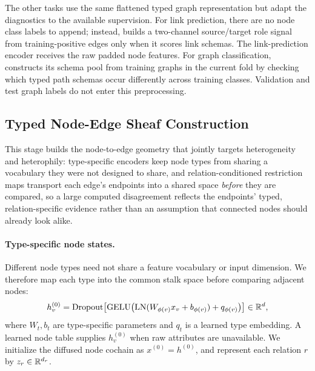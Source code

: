 The other tasks use the same flattened typed graph representation but adapt the diagnostics to the
available supervision.  For link prediction, there are no node class labels to append; instead,
\ampss{} builds a two-channel source/target role signal from training-positive edges only when it
scores link schemas.  The link-prediction encoder receives the raw padded node features.  For graph
classification, \ampss{} constructs its schema pool from training graphs in the current fold by
checking which typed path schemas occur differently across training classes.  Validation and test
graph labels do not enter this preprocessing.

\subsection{Typed Node-Edge Sheaf Construction}

This stage builds the node-to-edge geometry that jointly targets heterogeneity and heterophily:
type-specific encoders keep node types from sharing a vocabulary they were not designed to share,
and relation-conditioned restriction maps transport each edge's endpoints into a shared space
\emph{before} they are compared, so a large computed disagreement reflects the endpoints' typed,
relation-specific evidence rather than an assumption that connected nodes should already look
alike.

\paragraph{Type-specific node states.}
Different node types need not share a feature vocabulary or input dimension.  We therefore map
each type into the common stalk space before comparing adjacent nodes:
\begin{equation}
  h_v^{(0)}
  =\operatorname{Dropout}\!\left[
    \operatorname{GELU}\!\left(
      \operatorname{LN}(W_{\phi(v)}x_v+b_{\phi(v)})+q_{\phi(v)}
    \right)
  \right]\in\mathbb{R}^d ,
  \label{eq:node-encoder}
\end{equation}
where \(W_t,b_t\) are type-specific parameters and \(q_t\) is a learned type embedding.  A learned
node table supplies \(h_v^{(0)}\) when raw attributes are unavailable.  We initialize the diffused
node cochain as \(x^{(0)}=h^{(0)}\), and represent each relation \(r\) by
\(z_r\in\mathbb{R}^{d_r}\).

